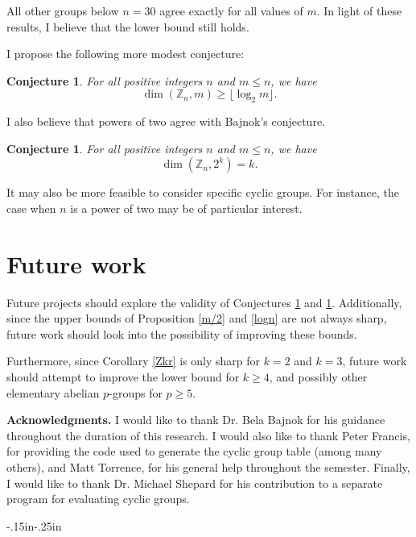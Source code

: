 \documentclass[11pt]{article}
\newcommand{\Z}{\mathbb{Z}}
\newtheorem{conj}[thm]{Conjecture}
\begin{document}
All other groups below $n=30$ agree exactly for all values of $m$. In light of these results, I believe that the lower bound still holds. 

I propose the following more modest conjecture:
\begin{conj}\label{newZn}
For all positive integers $n$ and $m\leq n$, we have
\[\dim(\Z_n,m)\geq\lfloor\log_2 m\rfloor.\]
\end{conj}

I also believe that powers of two agree with Bajnok's conjecture.

\begin{conj}\label{newZn2^k}
    For all positive integers $n$ and $m\leq n$, we have
    \[\dim(\Z_n,2^k)=k.\]
\end{conj}

It may also be more feasible to consider specific cyclic groups. For instance, the case when $n$ is a power of two may be of particular interest.

\section{Future work}

Future projects should explore the validity of Conjectures \ref{newZn} and \ref{newZn2^k}. Additionally, since the upper bounds of Proposition \ref{m/2} and \ref{logn} are not always sharp, future work should look into the possibility of improving these bounds. 

Furthermore, since Corollary \ref{Zkr} is only sharp for $k=2$ and $k=3$, future work should attempt to improve the lower bound for $k\geq4$, and possibly other elementary abelian $p$-groups for $p\geq5$.

{\bf Acknowledgments.} I would like to thank Dr. Bela Bajnok for his guidance throughout the duration of this research. I would also like to thank Peter Francis, for providing the code used to generate the cyclic group table (among many others), and Matt Torrence, for his general help throughout the semester. Finally, I would like to thank Dr. Michael Shepard for his contribution to a separate program for evaluating cyclic groups.

\begin{adjustwidth}{-.15in}{-.25in}
\printbibliography
\end{adjustwidth}
\end{document}
